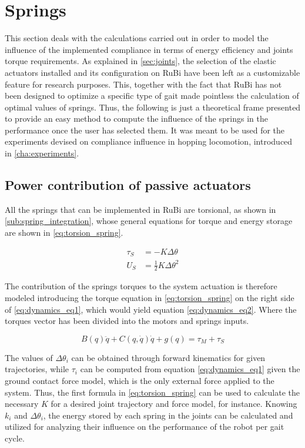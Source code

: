 
\section{Springs}
\label{sec_springs}
This section deals with the calculations carried out in order to model the influence of the implemented compliance in terms of energy efficiency and joints torque requirements.
As explained in \ref{sec:joints}, the selection of the elastic actuators installed and its configuration on RuBi have been left as a customizable feature for research purposes.
This, together with the fact that RuBi has not been designed to optimize a specific type of gait made pointless the calculation of optimal values of springs.
Thus, the following is just a theoretical frame presented to provide an easy method to compute the influence of the springs in the performance once the user has selected them.
It was meant to be used for the experiments devised on compliance influence in hopping locomotion, introduced in \ref{cha:experiments}.

\subsection{Power contribution of passive actuators} %
\label{sub:torque_contribution_of_passive_actuators}
All the springs that can be implemented in RuBi are torsional, as shown in \ref{sub:spring_integration}, whose general equations for torque and energy storage are shown in \ref{eq:torsion_spring}. 

\begin{equation}
\label{eq:torsion_spring}
\begin{aligned}
	\tau_{S} &= -K \Delta \theta \\
	U_{S} &= \frac{1}{2}K \Delta \theta^2
\end{aligned}
\end{equation}

The contribution of the springs torques to the system actuation is therefore modeled introducing the torque equation in \ref{eq:torsion_spring} on the right side of \ref{eq:dynamics_eq1}, which would yield equation \ref{eq:dynamics_eq2}.
Where the torques vector has been divided into the motors and springs inputs.

\begin{equation}
	\label{eq:dynamics_eq2}
	B(q)\ddot{q} + C(q,\dot{q})\dot{q} + g(q) = \tau_{M} + \tau_{S}
\end{equation}

The values of $\Delta \theta_{i}$ can be obtained through forward kinematics for given trajectories, while $\tau_{i}$ can be computed from equation \ref{eq:dynamics_eq1} given the ground contact force model, which is the only external force applied to the system.
Thus, the first formula in \ref{eq:torsion_spring} can be used to calculate the necessary $K$ for a desired joint trajectory and force model, for instance.
Knowing $k_{i}$ and $\Delta \theta_{i}$, the energy stored by each spring in the joints can be calculated and utilized for analyzing their influence on the performance of the robot per gait cycle.

